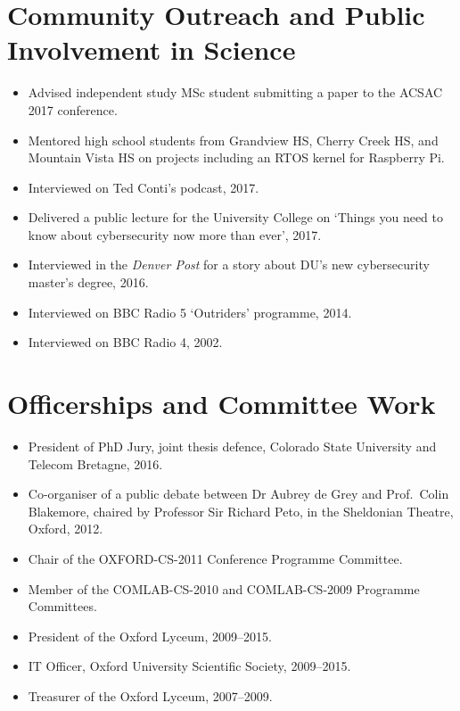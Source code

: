 \documentclass[12pt,twoside,letterpaper]{article}
\begin{document}
\section*{Community Outreach and Public Involvement in Science}
\vspace{-2mm}

\begin{itemize}
    \item Advised independent study MSc student submitting a paper to the
        ACSAC 2017 conference.
    \item Mentored high school students from Grandview HS, Cherry Creek HS,
        and Mountain Vista HS on projects including an RTOS kernel for
        Raspberry Pi.
    \item Interviewed on Ted Conti's podcast, 2017.
    \item Delivered a public lecture for the University College on `Things
        you need to know about cybersecurity now more than ever', 2017.
    \item Interviewed in the \emph{Denver Post} for a story about DU's new
        cybersecurity master's degree, 2016.
    \item Interviewed on BBC Radio 5 `Outriders' programme, 2014.
    \item Interviewed on BBC Radio 4, 2002.
\end{itemize}

\vspace{-7mm}
\section*{Officerships and Committee Work}
\vspace{-2mm}

\begin{itemize}
    \item President of PhD Jury, joint thesis defence, Colorado
        State University and Telecom Bretagne, 2016.
	\item Co-organiser of a public debate between Dr Aubrey de Grey
		and Prof.\ Colin Blakemore, chaired by Professor Sir Richard
		Peto, in the Sheldonian Theatre, Oxford, 2012.
	\item Chair of the OXFORD-CS-2011 Conference Programme Committee.
	\item Member of the COMLAB-CS-2010 and COMLAB-CS-2009 Programme
		Committees.
	\item President of the Oxford Lyceum, 2009--2015.
	\item IT Officer, Oxford University Scientific Society, 2009--2015.
	\item Treasurer of the Oxford Lyceum, 2007--2009.
\end{itemize}
\end{document}
